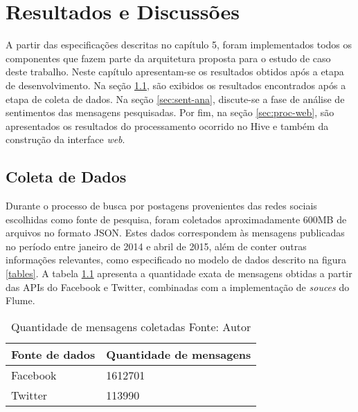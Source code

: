 \chapter{Resultados e Discussões}
\label{cap:resultados}

A partir das especificações descritas no capítulo 5, foram implementados todos os componentes que fazem parte da arquitetura proposta para o estudo de caso deste trabalho. Neste capítulo apresentam-se os resultados obtidos após a etapa de desenvolvimento. Na seção \ref{sec:coleta}, são exibidos os resultados encontrados após a etapa de coleta de dados. Na seção \ref{sec:sent-ana}, discute-se a fase de análise de sentimentos das mensagens pesquisadas. Por fim, na seção \ref{sec:proc-web}, são apresentados os resultados do processamento ocorrido no Hive e também da construção da interface \textit{web}.

\section{Coleta de Dados}
\label{sec:coleta}

Durante o processo de busca por postagens provenientes das redes sociais escolhidas como fonte de pesquisa, foram coletados aproximadamente 600MB de arquivos no formato JSON. Estes dados correspondem às mensagens publicadas no período entre janeiro de 2014 e abril de 2015, além de conter outras informações relevantes, como especificado no modelo de dados descrito na figura \ref{tables}. A tabela \ref{tab-result-fb-tw} apresenta a quantidade exata de mensagens obtidas a partir das APIs do Facebook e Twitter, combinadas com a implementação de \textit{souces} do Flume.

\begin{table}[!ht]
\begin{center}
  \begin{tabular}{|p{5cm}|p{5cm}|}
	\hline
	Fonte de dados & Quantidade de mensagens
	\\ \hline
	Facebook & 1612701
	\\ \hline
	Twitter & 113990
	\\ \hline
  \end{tabular}
  \captionsetup{justification=centering}
  \caption[Quantidade de mensagens coletadas]{Quantidade de mensagens coletadas
  \protect\linebreak Fonte: Autor}
\label{tab-result-fb-tw}
\end{center}
\end{table}
\FloatBarrier

